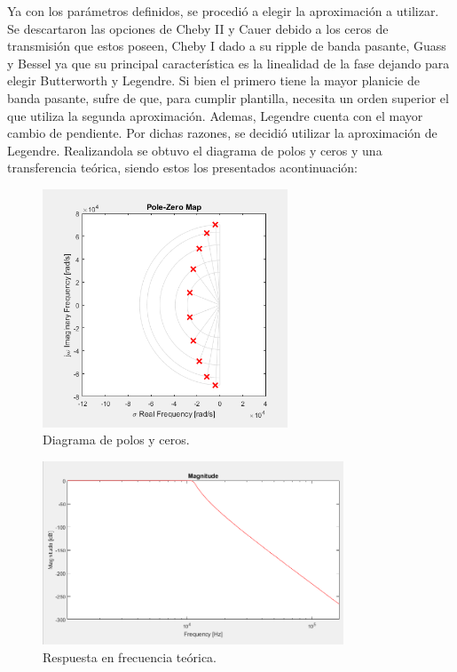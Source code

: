 Ya con los parámetros definidos, se procedió a elegir la aproximación a utilizar. Se descartaron las opciones de Cheby II y Cauer debido a los ceros de transmisión que estos poseen, Cheby I dado a su ripple de banda pasante, Guass y Bessel ya que su principal característica es la linealidad de la fase dejando para elegir Butterworth y Legendre. Si bien el primero tiene la mayor planicie de banda pasante, sufre de que, para cumplir plantilla, necesita un orden superior el que utiliza la segunda aproximación. Ademas, Legendre cuenta con el mayor cambio de pendiente. Por dichas razones, se decidió utilizar la aproximación de Legendre. Realizandola se obtuvo el diagrama de polos y ceros y una transferencia teórica, siendo estos los presentados acontinuación:
 \begin{figure}[H]
	\centering
	\includegraphics[width=0.65\textwidth]{ImagenesEjercicio2/polosyceros.PNG}
\caption{Diagrama de polos y ceros.}
	\label{fig:polosyceros}
\end{figure}
\begin{figure}[H]
	\centering
	\includegraphics[width=0.8\textwidth]{ImagenesEjercicio2/atenuation.PNG}
\caption{Respuesta en frecuencia teórica.}
	\label{fig:transteorica}
\end{figure}

